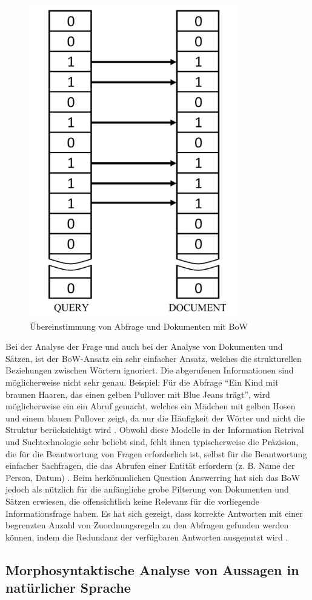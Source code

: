 \documentclass[
        ngerman,
        paper=a4,
        numbers=noendperiod,
]{scrreprt}
\begin{document}
\begin{figure}[H]
\centering\includegraphics[width=0.3\linewidth]{images/bow.png}
\caption[Übereinstimmung von Abfrage und Dokumenten mit BoW]{Übereinstimmung von Abfrage und Dokumenten mit BoW \cite [S. 5419]{Kolomiyets2011APerspective}}
\label{fig:bow}
\end{figure}

Bei der Analyse der Frage und auch bei der Analyse von Dokumenten und Sätzen, ist der BoW-Ansatz ein sehr einfacher Ansatz, welches die strukturellen Beziehungen zwischen Wörtern ignoriert. Die abgerufenen Informationen sind möglicherweise nicht sehr genau. Beispiel: Für die Abfrage \enquote{Ein Kind mit braunen Haaren, das einen gelben Pullover mit Blue Jeans trägt}, wird möglicherweise ein ein Abruf gemacht, welches ein Mädchen mit gelben Hosen und einem blauen Pullover zeigt, da nur die Häufigkeit der Wörter und nicht die Struktur berücksichtigt wird \citep [S. 5419]{Kolomiyets2011APerspective}. Obwohl diese Modelle in der Information Retrival und Suchtechnologie sehr beliebt sind, fehlt ihnen typischerweise die Präzision, die für die Beantwortung von Fragen erforderlich ist, selbst für die Beantwortung einfacher Sachfragen, die das Abrufen einer Entität erfordern (z. B. Name der Person, Datum) \citep{moldovan2003performance}. Beim  herkömmlichen Question Answerring hat sich das BoW jedoch als nützlich für die anfängliche grobe Filterung von Dokumenten und Sätzen erwiesen, die offensichtlich keine Relevanz für die vorliegende Informationsfrage haben. Es hat sich gezeigt, dass korrekte Antworten mit einer begrenzten Anzahl von Zuordnungsregeln zu den Abfragen gefunden werden können, indem die Redundanz der verfügbaren Antworten ausgenutzt wird \citep{brill2001data}.

    
    
\subsection{Morphosyntaktische Analyse von Aussagen in natürlicher Sprache}
\end{document}
